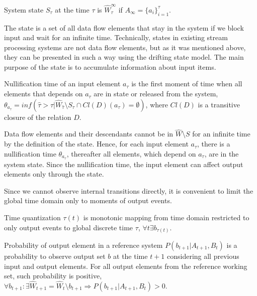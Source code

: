 
\begin{definition}{System state}
$S_\tau$ at the time $\tau$ is $\widehat{W}_\tau^{\infty}$ if $A_{\infty}=\{a_i\}^{\tau}_{i=1}$.
\end{definition}

The state is a set of all data flow elements that stay in the system if we block input and wait for an infinite time. Technically, states in existing stream processing systems are not data flow elements, but as it was mentioned above, they can be presented in such a way using the drifting state model. The main purpose of the state is to accumulate information about input items.

\begin{definition}{Nullification time}
of an input element $a_\tau$ is the first moment of time when all elements that depends on $a_\tau$ are in state or released from the system, $\theta_{a_\tau}=inf(\hat{\tau}>\tau|\widehat{W}_{\hat{\tau}}\setminus{S_{\hat{\tau}}}\cap{Cl(D)(a_\tau)=\emptyset})$, where $Cl(D)$ is a transitive closure of the relation $D$.
\end{definition}

Data flow elements and their descendants cannot be in $\widehat{W}\setminus{S}$ for an infinite time by the definition of the state. Hence, for each input element $a_\tau$, there is a nullification time $\theta_{a_\tau}$, thereafter all elements, which depend on $a_\tau$, are in the system state. Since the nullification time, the input element can affect output elements only through the state.

Since we cannot observe internal transitions directly, it is convenient to limit the global time domain only to moments of output events.

\begin{definition}{Time quantization}
$\tau(t)$ is monotonic mapping from time domain restricted to only output events to global discrete time $\tau$, $\forall{t}\exists{b_{\tau(t)}}$.
\end{definition}

\begin{definition}{Probability of output element in a reference system}
$P(b_{t+1}|A_{t+1}, B_t)$ is a probability to observe output set $b$ at the time $t+1$ considering all previous input and output elements. For all output elements from the reference working set, such probability is positive,\\
$\forall{b_{t+1}:\exists{\widehat{W}_{t+1}=\widehat{W}_{t}\setminus{b_{t+1}}}} \Rightarrow P(b_{t+1}|A_{t+1}, B_t) > 0$.
\end{definition}

